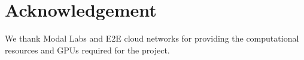 \section{Acknowledgement}
We thank Modal Labs and E2E cloud networks for providing the computational resources and GPUs required for the project.


